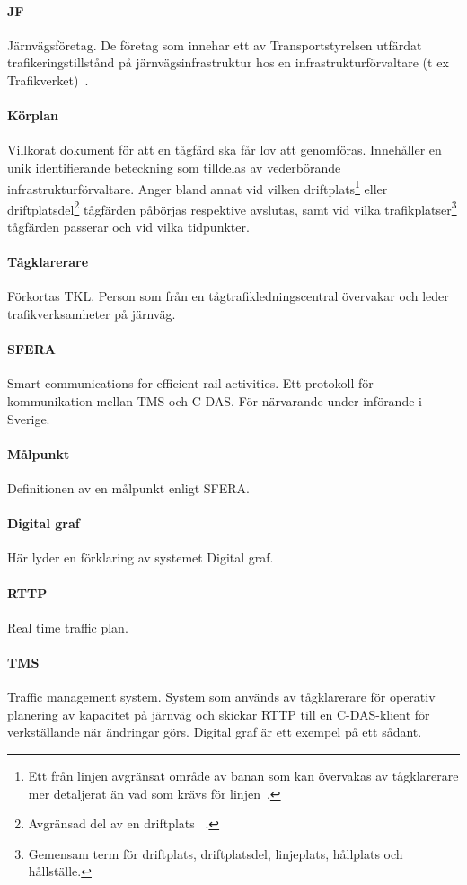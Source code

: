 \paragraph{JF}
Järnvägsföretag.
De företag som innehar ett av Transportstyrelsen utfärdat trafikeringstillstånd på järnvägsinfrastruktur hos en infrastrukturförvaltare (t ex Trafikverket)~\cite{Jarnvagsforetag2023}.
\paragraph{Körplan}
Villkorat dokument för att en tågfärd ska får lov att genomföras.
Innehåller en unik identifierande beteckning som tilldelas av vederbörande infrastrukturförvaltare.
Anger bland annat vid vilken driftplats\footnote{Ett från linjen avgränsat område av banan som kan övervakas av tågklarerare mer detaljerat än vad som krävs för linjen~\cite{TTJ2015}.} eller driftplatsdel\footnote{Avgränsad del av en driftplats ~\cite{TTJ2015}.} tågfärden påbörjas respektive avslutas, samt vid vilka trafikplatser\footnote{Gemensam term för driftplats, driftplatsdel, linjeplats, hållplats och hållställe\cite{TTJ2015}.} tågfärden passerar och vid vilka tidpunkter.
~\cite{TTJ2015}
\paragraph{Tågklarerare}
Förkortas TKL. Person som från en tågtrafikledningscentral övervakar och leder trafikverksamheter på järnväg.
\paragraph{SFERA}
Smart communications for efficient rail activities.
Ett protokoll för kommunikation mellan TMS och C-DAS.
För närvarande under införande i Sverige.
\cite{Joborn2023}
\paragraph{Målpunkt}
Definitionen av en målpunkt enligt SFERA.
\paragraph{Digital graf}
Här lyder en förklaring av systemet Digital graf.
\paragraph{RTTP}
Real time traffic plan.
~\cite{Joborn2023}
\paragraph{TMS}
Traffic management system.
System som används av tågklarerare för operativ planering av kapacitet på järnväg och skickar RTTP till en C-DAS-klient för verkställande när ändringar görs.
Digital graf är ett exempel på ett sådant.
~\cite{Joborn2023}

